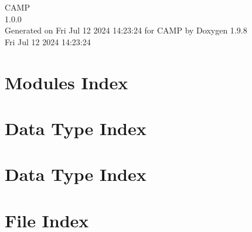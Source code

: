 \documentclass[twoside]{book}
\newcommand{\+}{\discretionary{\mbox{\scriptsize$\hookleftarrow$}}{}{}}
\newcommand{\clearemptydoublepage}{%
    \newpage{\pagestyle{empty}\cleardoublepage}%
  }
\begin{document}
  \raggedbottom
    \hypersetup{pageanchor=false,
                bookmarksnumbered=true,
                pdfencoding=unicode
               }
  \begin{titlepage}
  \vspace*{7cm}
  \begin{center}%
  {\Large CAMP}\\
  [1ex]\large 1.\+0.\+0 \\
  \vspace*{1cm}
  {\large Generated on Fri Jul 12 2024 14\+:23\+:24 for CAMP by Doxygen 1.9.8}\\
    \vspace*{0.5cm}
    {\small Fri Jul 12 2024 14:23:24}
  \end{center}
  \end{titlepage}
  \clearemptydoublepage
  \tableofcontents
  \clearemptydoublepage
  \hypersetup{pageanchor=true}















\chapter{Modules Index}

\chapter{Data Type Index}

\chapter{Data Type Index}

\chapter{File Index}

\end{document}

